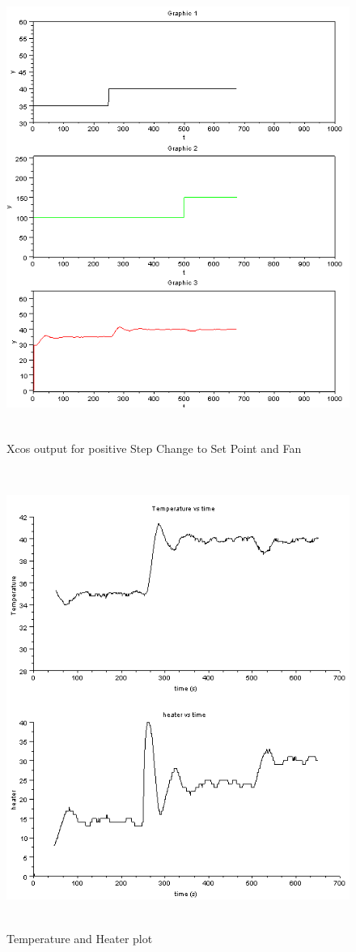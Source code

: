 \begin{figure}[H]
  \includegraphics[width=12cm, height=15cm]{mpc/1_1.png}
  \caption{Xcos output for positive Step Change to Set Point and Fan}
\end{figure}
\begin{figure}[H]
  \includegraphics[width=12cm, height=15cm]{mpc/1_1_heater_final.png}
  \caption{Temperature and Heater plot}
\end{figure}
